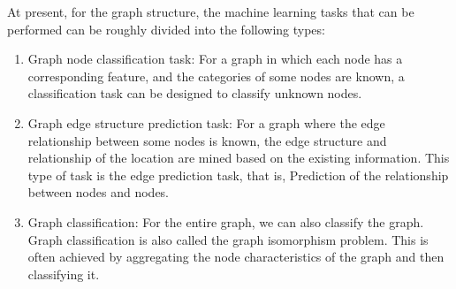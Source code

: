 At present, for the graph structure, the machine learning tasks that can be performed can be roughly divided into the following types:
\begin{enumerate}
	\item Graph node classification task: For a graph in which each node has a corresponding feature, and the categories of some nodes are known, a classification task can be designed to classify unknown nodes.
	\item Graph edge structure prediction task: For a graph where the edge relationship between some nodes is known, the edge structure and relationship of the location are mined based on the existing information. This type of task is the edge prediction task, that is, Prediction of the relationship between nodes and nodes.
	\item Graph classification: For the entire graph, we can also classify the graph. Graph classification is also called the graph isomorphism problem. This is often achieved by aggregating the node characteristics of the graph and then classifying it.
\end{enumerate}


